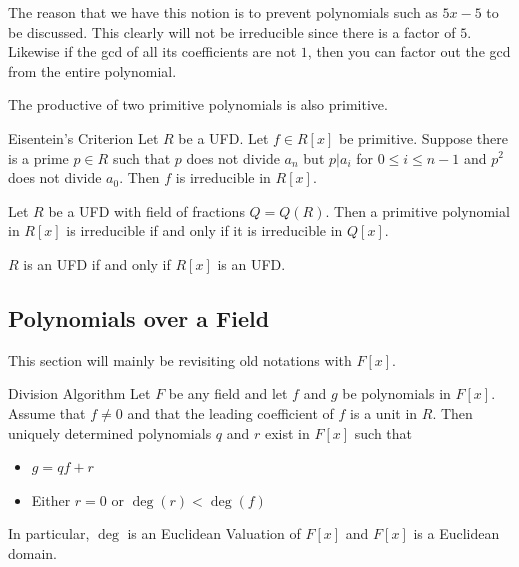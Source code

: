 \documentclass[a4paper]{article}
\begin{document}
The reason that we have this notion is to prevent polynomials such as $5x-5$ to be discussed. This clearly will not be irreducible since there is a factor of $5$. Likewise if the gcd of all its coefficients are not $1$, then you can factor out the gcd from the entire polynomial. 

\begin{prp}{}{} The productive of two primitive polynomials is also primitive. 
\end{prp}

\begin{prp}{Eisentein's Criterion}{} Let $R$ be a UFD. Let $f\in R[x]$ be primitive. Suppose there is a prime $p\in R$ such that $p$ does not divide $a_n$ but $p|a_i$ for $0\leq i\leq n-1$ and $p^2$ does not divide $a_0$. Then $f$ is irreducible in $R[x]$. 
\end{prp}

\begin{thm}{}{} Let $R$ be a UFD with field of fractions $Q=Q(R)$. Then a primitive polynomial in $R[x]$ is irreducible if and only if it is irreducible in $Q[x]$. 
\end{thm}

\begin{prp}{}{} $R$ is an UFD if and only if $R[x]$ is an UFD. 
\end{prp}

\subsection{Polynomials over a Field}
This section will mainly be revisiting old notations with $F[x]$. 
\begin{thm}{Division Algorithm}{} Let $F$ be any field and let $f$ and $g$ be polynomials in $F[x]$. Assume that $f\neq0$ and that the leading coefficient of $f$ is a unit in $R$. Then uniquely determined polynomials $q$ and $r$ exist in $F[x]$ such that 
\begin{itemize}
\item $g=qf+r$
\item Either $r=0$ or $\deg(r)<\deg(f)$
\end{itemize}
In particular, $\deg$ is an Euclidean Valuation of $F[x]$ and $F[x]$ is a Euclidean domain. 
\end{thm}
\end{document}
